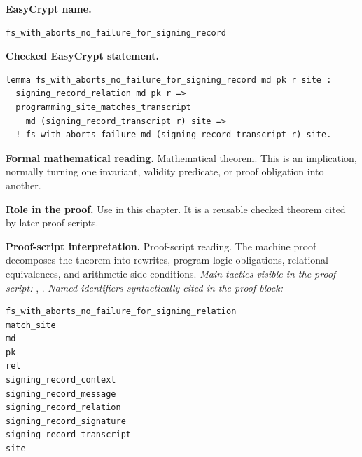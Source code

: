 \begin{formaltheorem}
\noindent\textbf{EasyCrypt name.}
\begin{lstlisting}[language=EasyCrypt,basicstyle=\ttfamily\scriptsize]
fs_with_aborts_no_failure_for_signing_record
\end{lstlisting}
\noindent\textbf{Checked EasyCrypt statement.}
\begin{lstlisting}[language=EasyCrypt,basicstyle=\ttfamily\scriptsize]
lemma fs_with_aborts_no_failure_for_signing_record md pk r site :
  signing_record_relation md pk r =>
  programming_site_matches_transcript
    md (signing_record_transcript r) site =>
  ! fs_with_aborts_failure md (signing_record_transcript r) site.
\end{lstlisting}
\noindent\textbf{Formal mathematical reading.}
Mathematical theorem. This is an implication, normally turning one invariant, validity predicate, or proof obligation into another.

\noindent\textbf{Role in the proof.}
Use in this chapter. It is a reusable checked theorem cited by later proof scripts.

\noindent\textbf{Proof-script interpretation.}
Proof-script reading. The machine proof decomposes the theorem into rewrites, program-logic obligations, relational equivalences, and arithmetic side conditions.
\emph{Main tactics visible in the proof script:} , .
\emph{Named identifiers syntactically cited in the proof block:}
\begin{lstlisting}[language=EasyCrypt,basicstyle=\ttfamily\scriptsize]
fs_with_aborts_no_failure_for_signing_relation
match_site
md
pk
rel
signing_record_context
signing_record_message
signing_record_relation
signing_record_signature
signing_record_transcript
site
\end{lstlisting}

\end{formaltheorem}


